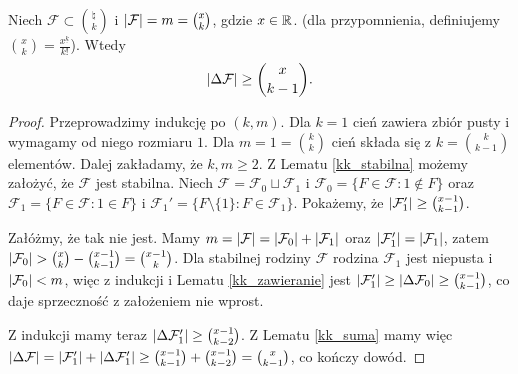 \begin{theorem}[Lov\'{a}sz]
	Niech \(\mathcal F\subset\binom{\natural}{k}\) i \(\card{\mathcal F} = m =
	\binom{x}{k}\), gdzie \(x\in\mathbb{R}\).
	(dla przypomnienia, definiujemy \(\binom{x}{k} = \frac{x^{\underline{k}}}{k!}\)).
	Wtedy \[\card{\Delta\mathcal F} \ge \binom{x}{k-1}.\]
\end{theorem}
\begin{proof}
	Przeprowadzimy indukcję po \((k,m)\). Dla \(k=1\) cień zawiera zbiór pusty i
	wymagamy od niego rozmiaru \(1\). Dla \(m=1 = \binom{k}{k}\) cień składa się z \(k
	= \binom{k}{k-1}\) elementów. Dalej zakładamy, że \(k,m\ge 2\). Z Lematu
	\ref{kk_stabilna} możemy założyć, że \(\mathcal F\) jest stabilna. Niech
	\(\mathcal F = \mathcal F_0 \sqcup \mathcal F_1\) i \(\mathcal F_0 = \{F \in
	\mathcal F : 1 \notin F\}\) oraz \(\mathcal F_1 = \{F \in \mathcal F : 1 \in
	F\}\) i \(\mathcal F_1' = \{F \setminus \{1\} : F \in \mathcal F_1\}\).
	Pokażemy, że \(\card{\mathcal F'_1} \ge \binom{x-1}{k-1}\).

	Załóżmy, że tak nie jest. Mamy \(m=\card{\mathcal F} = \card{\mathcal F_0} +
	\card{\mathcal F_1}\) oraz \(\card{\mathcal F'_1} = \card{\mathcal F_1}\), zatem
	\(\card{\mathcal F_0} > \binom{x}{k} - \binom{x-1}{k-1} = \binom{x-1}{k}\). Dla
	stabilnej rodziny \(\mathcal F\) rodzina \(\mathcal F_1\) jest niepusta i
	\(\card{\mathcal F_0} < m\), więc z indukcji i Lematu \ref{kk_zawieranie} jest
	\(\card{\mathcal F'_1} \ge \card{\Delta\mathcal F_0} \ge \binom{x-1}{k-1}\), co
	daje sprzeczność z założeniem nie wprost.

	Z indukcji mamy teraz \(\card{\Delta\mathcal F'_1} \ge \binom{x-1}{k-2}\). Z
	Lematu \ref{kk_suma} mamy więc \(\card{\Delta\mathcal F} = \card{\mathcal
		F'_1} + \card{\Delta\mathcal F'_1} \ge \binom{x-1}{k-1} + \binom{x-1}{k-2} =
	\binom{x}{k-1}\), co kończy dowód.
\end{proof}



